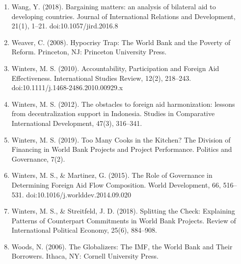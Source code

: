 \documentclass{article}
\begin{document}
\begin{singlespace}
\begin{enumerate}
	\item Wang, Y. (2018). Bargaining matters: an analysis of bilateral aid to developing countries. Journal of International Relations and Development, 21(1), 1–21. doi:10.1057/jird.2016.8
	\item Weaver, C. (2008). Hypocrisy Trap: The World Bank and the Poverty of Reform. Princeton, NJ: Princeton University Press.
	\item Winters, M. S. (2010). Accountability, Participation and Foreign Aid Effectiveness. International Studies Review, 12(2), 218–243. doi:10.1111/j.1468-2486.2010.00929.x
	\item Winters, M. S. (2012). The obstacles to foreign aid harmonization: lessons from decentralization support in Indonesia. Studies in Comparative International Development, 47(3), 316–341.
	\item Winters, M. S. (2019). Too Many Cooks in the Kitchen? The Division of Financing in World Bank Projects and Project Performance. Politics and Governance, 7(2).
	\item Winters, M. S., \& Martinez, G. (2015). The Role of Governance in Determining Foreign Aid Flow Composition. World Development, 66, 516–531. doi:10.1016/j.worlddev.2014.09.020
	\item Winters, M. S., \& Streitfeld, J. D. (2018). Splitting the Check: Explaining Patterns of Counterpart Commitments in World Bank Projects. Review of International Political Economy, 25(6), 884–908.
	\item Woods, N. (2006). The Globalizers: The IMF, the World Bank and Their Borrowers. Ithaca, NY: Cornell University Press.
\end{enumerate}
\end{singlespace}
\end{document}

